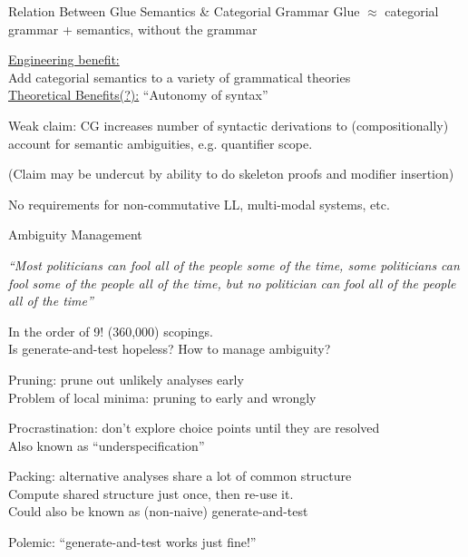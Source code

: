 \begin{hslide}{Relation Between Glue Semantics \& Categorial Grammar}
Glue $\approx$ categorial grammar + semantics, without the grammar


\underline{Engineering benefit:}\\
Add categorial semantics to a variety of grammatical theories\\[1ex]
%
\underline{Theoretical Benefits(?):} ``Autonomy of syntax''\\ \vspace*{-4ex}
\begin{items}
\item Weak claim: CG increases number of syntactic derivations
to (compositionally) account for semantic ambiguities, e.g.
quantifier scope.

(Claim may be undercut by ability to do skeleton proofs and modifier
insertion)

\item No requirements for non-commutative LL, multi-modal systems,
etc.
\end{items}

\end{hslide}



\begin{hslide}{Ambiguity Management}

{\small\it ``Most politicians can fool all of the people some of the time, 
some politicians can fool some of the people all of the time, but no
politician can fool all of the people all of the time''}

In the order of 9! (360,000) scopings.\\
Is generate-and-test hopeless? How to manage ambiguity?

\begin{items}
\item Pruning: prune out unlikely analyses early\\
{\small Problem of local minima: pruning to early and wrongly}

\item Procrastination: don't explore choice points until they are resolved\\
{\small Also known as ``underspecification''}

\item Packing: alternative analyses share a lot of common structure\\
Compute shared structure just once, then re-use it.\\
{\small Could also be known as (non-naive) generate-and-test}
\end{items}

Polemic: ``generate-and-test works just fine!''
\end{hslide}
 
